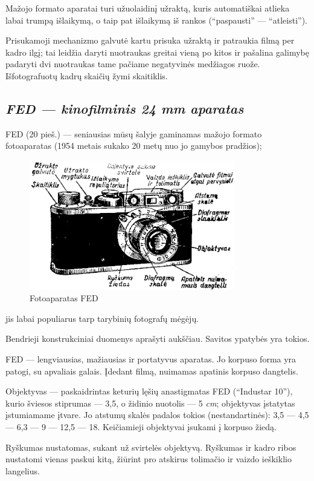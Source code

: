 \documentclass[12pt]{book}
\begin{document}
			Mažojo formato aparatai turi užuolaidinį užraktą, kuris automatiškai atlieka labai trumpą išlaikymą, o taip pat išlaikymą iš rankos (``paspausti'' --- ``atleisti'').

			Prisukamoji mechanizmo galvutė kartu prisuka užraktą ir patraukia filmą per kadro ilgį; tai leidžia daryti nuotraukas greitai vieną po kitos ir pašalina galimybę padaryti dvi nuotraukas tame pačiame negatyvinės medžiagos ruože. Išfotografuotų kadrų skaičių žymi skaitiklis.
		\subsection*{\textit{FED --- kinofilminis 24  mm aparatas}}
			FED (20 pieš.) --- seniausias mūsų šalyje gaminamas mažojo formato fotoaparatas (1954 metais sukako 20 metų nuo jo gamybos pradžios);
			\begin{figure}[h]
				\centering
				\includegraphics[width=0.8\textwidth]{20-pav}
				\caption{Fotoaparatas FED}
				\label{fig:20}
			\end{figure}
			jis labai populiarus tarp tarybinių fotografų mėgėjų.

			Bendrieji konstrukciniai duomenys aprašyti aukščiau. Savitos ypatybės yra tokios.

			FED --- lengviausias, mažiausias ir portatyvus aparatas. Jo korpuso forma yra patogi, su apvaliais galais. Įdedant filmą, nuimamas apatinis korpuso dangtelis.

			Objektyvas --- paskaidrintas keturių lęšių anastigmatas FED (``Industar 10''), kurio šviesos stiprumas --- 3,5, o židinio nuotolis --- 5 \textit{cm}; objektyvas įstatytas įstumiamame įtvare. Jo atstumų skalės padalos tokios (nestandartinės): 3,5 --- 4,5 --- 6,3 --- 9 --- 12,5 --- 18. Keičiamieji objektyvai įsukami į korpuso žiedą.

			Ryškumas nustatomas, sukant už svirtelės objektyvą. Ryškumas ir kadro ribos nustatomi vienas paskui kitą, žiūrint pro atskirus tolimačio ir vaizdo ieškiklio langelius.
\end{document}
